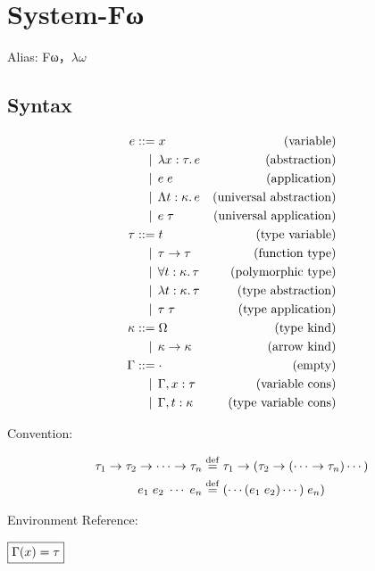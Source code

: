 \section{System-Fω}

Alias: Fω，$\lambda\omega$ \cite{Rossberg:2014}

\subsection{Syntax}

\begin{align*}
  e
  &\BNFassign x &(\text{variable}) \\
  &\BNFor \lambda x: \tau\ldotp e &(\text{abstraction}) \\
  &\BNFor e\; e &(\text{application}) \\
  &\BNFor \Lambda t: \kappa\ldotp e &(\text{universal abstraction}) \\
  &\BNFor e\; \tau &(\text{universal application}) \\
  \tau
  &\BNFassign t &(\text{type variable}) \\
  &\BNFor \tau \to \tau &(\text{function type}) \\
  &\BNFor \forall t: \kappa\ldotp \tau &(\text{polymorphic type}) \\
  &\BNFor \lambda t: \kappa\ldotp \tau &(\text{type abstraction}) \\
  &\BNFor \tau\; \tau &(\text{type application}) \\
  \kappa
  &\BNFassign \Omega &(\text{type kind}) \\
  &\BNFor \kappa \to \kappa &(\text{arrow kind}) \\
  \Gamma
  &\BNFassign \cdot &(\text{empty}) \\
  &\BNFor \Gamma, x: \tau &(\text{variable cons}) \\
  &\BNFor \Gamma, t: \kappa &(\text{type variable cons})
\end{align*}

Convention:

\begin{align*}
  \tau_1 \to \tau_2 \to \cdots \to \tau_n &\mathrel{\overset{\mathrm{def}}{=}} \tau_1 \to (\tau_2 \to (\cdots \to \tau_n) \cdots ) \\
  e_1\; e_2\; \cdots \; e_n &\mathrel{\overset{\mathrm{def}}{=}} (\cdots(e_1\; e_2)\cdots)\; e_n)
\end{align*}

Environment Reference:

$\fbox{$\Gamma(x) = \tau$}$

